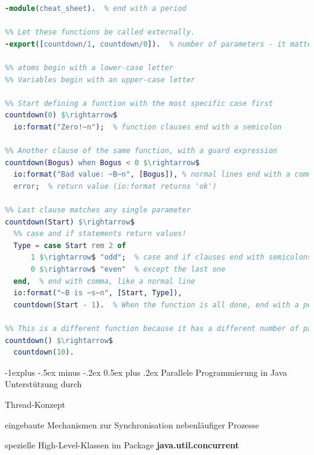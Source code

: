 \documentclass[10pt]{article}
\makeatletter
\renewcommand{\subsection}{\@startsection{subsection}{2}{0mm}%
                                {-1explus -.5ex minus -.2ex}%
                                {0.5ex plus .2ex}%
                                {\normalfont\normalsize\bfseries}}
\makeatother
\begin{document}
\begin{lstlisting}[language=erlang]
%[Hello.erl]
-module(cheat_sheet).  % end with a period

%% Let these functions be called externally.
-export([countdown/1, countdown/0]).  % number of parameters - it matters!

%% atoms begin with a lower-case letter
%% Variables begin with an upper-case letter

%% Start defining a function with the most specific case first
countdown(0) $\rightarrow$  
  io:format("Zero!~n");  % function clauses end with a semicolon

%% Another clause of the same function, with a guard expression
countdown(Bogus) when Bogus < 0 $\rightarrow$
  io:format("Bad value: ~B~n", [Bogus]), % normal lines end with a comma
  error;  % return value (io:format returns 'ok')
  
%% Last clause matches any single parameter
countdown(Start) $\rightarrow$
  %% case and if statements return values!
  Type = case Start rem 2 of
      1 $\rightarrow$ "odd";  % case and if clauses end with semicolons
      0 $\rightarrow$ "even"  % except the last one
  end,  % end with comma, like a normal line
  io:format("~B is ~s~n", [Start, Type]), 
  countdown(Start - 1).  % When the function is all done, end with a period

%% This is a different function because it has a different number of parameters.
countdown() $\rightarrow$
  countdown(10).
\end{lstlisting}
  
  
  \subsection{Parallele Programmierung in Java}
  Unterstützung durch
  \begin{itemize*}
    \item Thread-Konzept
    \item eingebaute Mechanismen zur Synchronisation nebenläufiger Prozesse
    \item spezielle High-Level-Klassen im Package
    \newline \textbf{java.util.concurrent}
  \end{itemize*}
  
\end{document}
